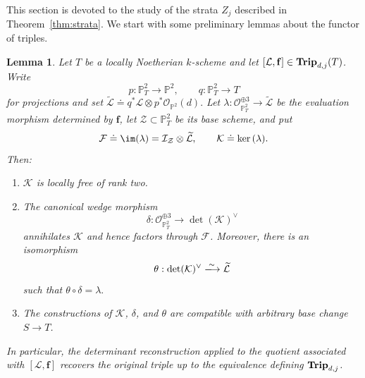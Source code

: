 \documentclass[11pt]{amsart} %
\newcommand{\lar}{\longrightarrow}
\newtheorem{Lemma}[Theorem]{Lemma}
\theoremstyle{definition}
\def\ker{{\rm ker}\,}
\def\NZQ{\mathbb}               %
\def\PP{{\NZQ P}}
\def\Trip{{\bf Trip}}
\begin{document}
This section is devoted to the study of the strata $Z_j$ described in Theorem~\ref{thm:strata}. We start with some preliminary lemmas about the functor of triples.

\begin{Lemma}
\label{lem:compatibility-determinant}
Let $T$ be a locally Noetherian $k$-scheme and let \([\mathcal L,\mathbf f]\in \Trip_{d,j}(T)\). Write
\[
p:\PP^2_T\lar\PP^2,
\qquad
q:\PP^2_T\lar T
\]
for projections and set \( \widetilde{\mathcal L}
\doteq
q^*\mathcal L\otimes p^*\mathcal O_{\PP^2}(d).
\)
Let \(
\lambda:
\mathcal O_{\PP^2_T}^{\oplus3}
\longrightarrow
\widetilde{\mathcal L}\) be the evaluation morphism determined by $\mathbf f$, let
$\mathcal Z\subset\PP^2_T$ be its base scheme, and put
\[
\mathcal F\doteq\im(\lambda)
=
\mathcal I_{\mathcal Z}\otimes\widetilde{\mathcal L},
\qquad
\mathcal K\doteq\ker(\lambda).
\]
Then:

\begin{enumerate}
    \item[(a)] $\mathcal K$ is locally free of rank two.

    \item[(b)] The canonical wedge morphism
    \[
    \delta:
    \mathcal O_{\PP^2_T}^{\oplus3}
    \longrightarrow
    \det(\mathcal K)^\vee
    \]
    annihilates $\mathcal K$ and hence factors through $\mathcal F$.
    Moreover, there is an isomorphism
    \[
    \theta:
    \det(\mathcal K)^\vee
    \xlongrightarrow{\sim}
    \widetilde{\mathcal L}
    \]
    such that
    \(
    \theta\circ\delta=\lambda.
    \)

    \item[(c)] The constructions of $\mathcal K$, $\delta$, and $\theta$
    are compatible with arbitrary base change $S\lar T$.
\end{enumerate}

In particular, the determinant reconstruction applied to the quotient
associated with $[\mathcal L,\mathbf f]$ recovers the original triple
up to the equivalence defining $\Trip_{d,j}$.
\end{Lemma}
\end{document}
